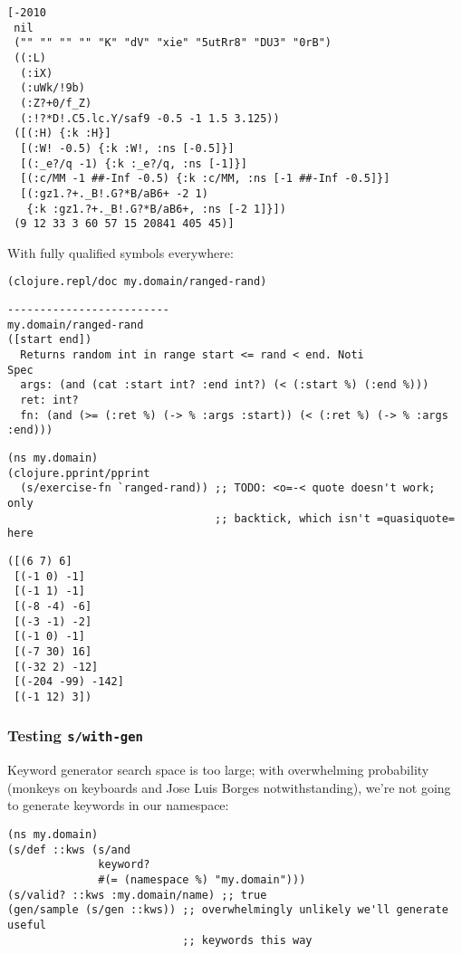 \documentclass[10pt,oneside,x11names]{article}
\begin{document}
\begin{verbatim}
[-2010
 nil
 ("" "" "" "" "K" "dV" "xie" "5utRr8" "DU3" "0rB")
 ((:L)
  (:iX)
  (:uWk/!9b)
  (:Z?+0/f_Z)
  (:!?*D!.C5.lc.Y/saf9 -0.5 -1 1.5 3.125))
 ([(:H) {:k :H}]
  [(:W! -0.5) {:k :W!, :ns [-0.5]}]
  [(:_e?/q -1) {:k :_e?/q, :ns [-1]}]
  [(:c/MM -1 ##-Inf -0.5) {:k :c/MM, :ns [-1 ##-Inf -0.5]}]
  [(:gz1.?+._B!.G?*B/aB6+ -2 1)
   {:k :gz1.?+._B!.G?*B/aB6+, :ns [-2 1]}])
 (9 12 33 3 60 57 15 20841 405 45)]
\end{verbatim}

With fully qualified symbols everywhere:

\begin{verbatim}
(clojure.repl/doc my.domain/ranged-rand)
\end{verbatim}

\begin{verbatim}
-------------------------
my.domain/ranged-rand
([start end])
  Returns random int in range start <= rand < end. Noti
Spec
  args: (and (cat :start int? :end int?) (< (:start %) (:end %)))
  ret: int?
  fn: (and (>= (:ret %) (-> % :args :start)) (< (:ret %) (-> % :args :end)))
\end{verbatim}


\begin{verbatim}
(ns my.domain)
(clojure.pprint/pprint
  (s/exercise-fn `ranged-rand)) ;; TODO: <o=-< quote doesn't work; only
                                ;; backtick, which isn't =quasiquote= here
\end{verbatim}

\begin{verbatim}
([(6 7) 6]
 [(-1 0) -1]
 [(-1 1) -1]
 [(-8 -4) -6]
 [(-3 -1) -2]
 [(-1 0) -1]
 [(-7 30) 16]
 [(-32 2) -12]
 [(-204 -99) -142]
 [(-1 12) 3])
\end{verbatim}

\subsubsection{Testing \texttt{s/with-gen}}
\label{sec:org8952162}

Keyword generator search space is too large; with overwhelming probability
(monkeys on keyboards and Jose Luis Borges notwithstanding), we're not going to
generate keywords in our namespace:

\begin{verbatim}
(ns my.domain)
(s/def ::kws (s/and
              keyword?
              #(= (namespace %) "my.domain")))
(s/valid? ::kws :my.domain/name) ;; true
(gen/sample (s/gen ::kws)) ;; overwhelmingly unlikely we'll generate useful
                           ;; keywords this way
\end{verbatim}
\end{document}
